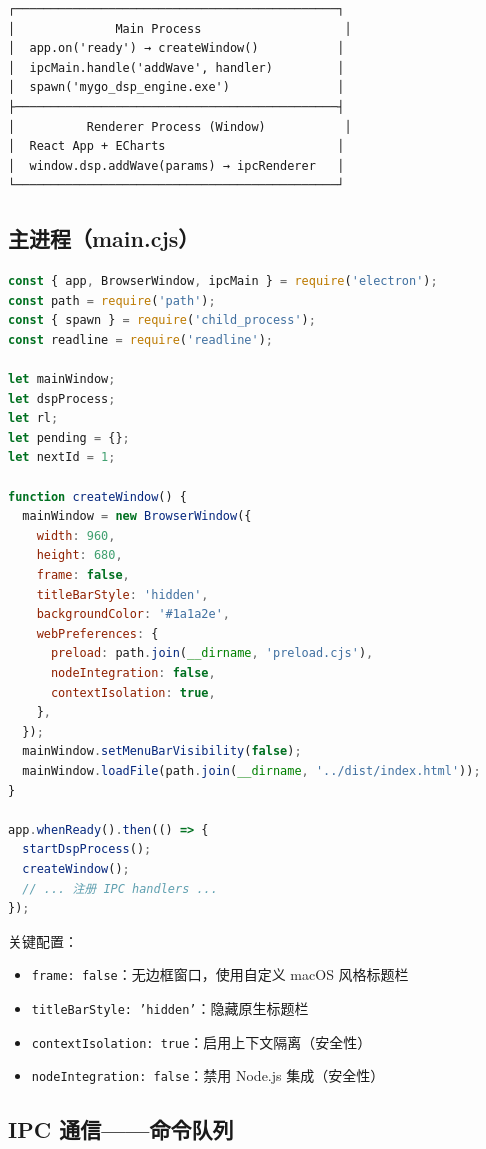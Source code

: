 ﻿\documentclass[12pt,a4paper,oneside]{ctexbook}
\begin{document}
\begin{verbatim}
┌─────────────────────────────────────────────┐
│              Main Process                    │
│  app.on('ready') → createWindow()           │
│  ipcMain.handle('addWave', handler)         │
│  spawn('mygo_dsp_engine.exe')               │
├─────────────────────────────────────────────┤
│          Renderer Process (Window)           │
│  React App + ECharts                        │
│  window.dsp.addWave(params) → ipcRenderer   │
└─────────────────────────────────────────────┘
\end{verbatim}

\subsection{主进程（main.cjs）}

\begin{lstlisting}[language=JavaScript, caption={Electron 主进程——窗口创建}]
const { app, BrowserWindow, ipcMain } = require('electron');
const path = require('path');
const { spawn } = require('child_process');
const readline = require('readline');

let mainWindow;
let dspProcess;
let rl;
let pending = {};
let nextId = 1;

function createWindow() {
  mainWindow = new BrowserWindow({
    width: 960,
    height: 680,
    frame: false,
    titleBarStyle: 'hidden',
    backgroundColor: '#1a1a2e',
    webPreferences: {
      preload: path.join(__dirname, 'preload.cjs'),
      nodeIntegration: false,
      contextIsolation: true,
    },
  });
  mainWindow.setMenuBarVisibility(false);
  mainWindow.loadFile(path.join(__dirname, '../dist/index.html'));
}

app.whenReady().then(() => {
  startDspProcess();
  createWindow();
  // ... 注册 IPC handlers ...
});
\end{lstlisting}

关键配置：
\begin{itemize}
    \item \texttt{frame: false}：无边框窗口，使用自定义 macOS 风格标题栏
    \item \texttt{titleBarStyle: 'hidden'}：隐藏原生标题栏
    \item \texttt{contextIsolation: true}：启用上下文隔离（安全性）
    \item \texttt{nodeIntegration: false}：禁用 Node.js 集成（安全性）
\end{itemize}

\subsection{IPC 通信——命令队列}
\end{document}
